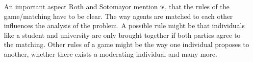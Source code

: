 An important aspect Roth and Sotomayor mention is, that the rules of the game/matching have to be clear. The way agents are matched to each other influences the analysis of the problem. A possible rule might be that individuals like a student and university are only brought together if both parties agree to the matching. Other rules of a game might be the way one individual proposes to another, whether there exists a moderating individual and many more. \cite[p. 492]{roth1992two}